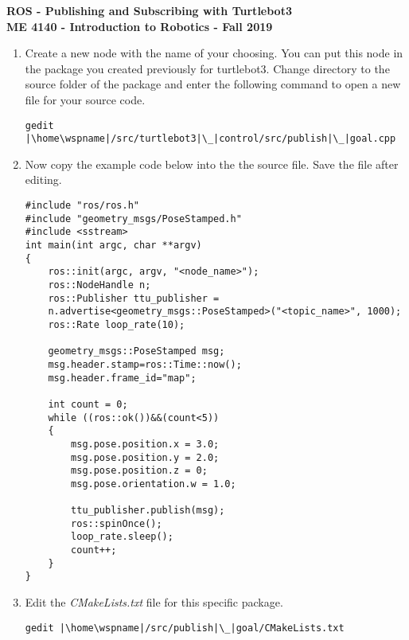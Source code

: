 \documentclass[12pt]{article}
\newcommand{\wspname}{<workspace\_name>}
\newcommand{\home}{\textasciitilde/}
\begin{document}
\thispagestyle{plain}

\begin{center}
   {\bf \Large ROS - Publishing and Subscribing with Turtlebot3 }\vspace{2mm} \\
   {\bf \large ME 4140 - Introduction to Robotics - Fall 2019} \\
\end{center}


\begin{enumerate}
    
    \item Create a new node with the name of your choosing. You can put this node in the package you created previously for turtlebot3.  Change directory to the source folder of the package and enter the following command to open a new file for your source code.
\begin{verbatim}
gedit |\home\wspname|/src/turtlebot3|\_|control/src/publish|\_|goal.cpp
\end{verbatim}

    

    \item Now copy the example code below into the the source file. Save the file after editing. \\
    
        \begin{lstlisting}
#include "ros/ros.h"
#include "geometry_msgs/PoseStamped.h"
#include <sstream>
int main(int argc, char **argv)
{
    ros::init(argc, argv, "<node_name>");
    ros::NodeHandle n;
    ros::Publisher ttu_publisher =
    n.advertise<geometry_msgs::PoseStamped>("<topic_name>", 1000);
    ros::Rate loop_rate(10);

    geometry_msgs::PoseStamped msg;
    msg.header.stamp=ros::Time::now();
    msg.header.frame_id="map";

    int count = 0;
    while ((ros::ok())&&(count<5))  
    {               
        msg.pose.position.x = 3.0;
        msg.pose.position.y = 2.0;
        msg.pose.position.z = 0;
        msg.pose.orientation.w = 1.0;

        ttu_publisher.publish(msg);
        ros::spinOnce();
        loop_rate.sleep();
        count++;
    }
}
\end{lstlisting}
    
    \newpage
    
    \item Edit the {\it CMakeLists.txt} file for this specific package. \\
\begin{verbatim}
gedit |\home\wspname|/src/publish|\_|goal/CMakeLists.txt
\end{verbatim}


\end{enumerate}
\end{document}
